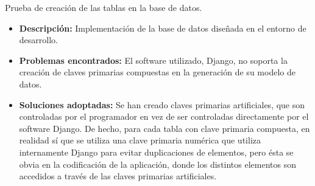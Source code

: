\item Prueba de creación de las tablas en la base de datos.
  \begin{itemize}
    \item \textbf{Descripción:} Implementación de la base de datos diseñada
    en el entorno de desarrollo.
    \item \textbf{Problemas encontrados:} El software utilizado, Django, no
    soporta la creación de claves primarias compuestas en la generación de su
    modelo de datos.
    \item \textbf{Soluciones adoptadas:} Se han creado claves primarias
    artificiales, que son controladas por el programador en vez de ser
    controladas directamente por el software Django. De hecho, para cada tabla
    con clave primaria compuesta, en realidad sí que se utiliza una clave
    primaria numérica que utiliza internamente Django para evitar duplicaciones
    de elementos, pero ésta se obvia en la codificación de la aplicación, donde
    los distintos elementos son accedidos a través de las claves primarias
    artificiales.
  \end{itemize}
